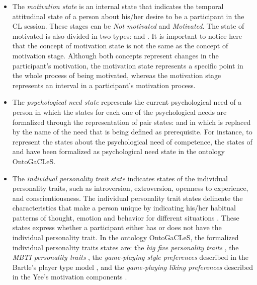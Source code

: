 \begin{itemize}
\item
The \emph{motivation state} is an internal state that indicates the temporal attitudinal state of a person about his/her desire to be a participant in the CL session.
These stages can be \emph{Not motivated} and \emph{Motivated}. The state of motivated is also divided in two types:  and  \cite{DeciRyan2010}.
It is important to notice here that the concept of motivation state is not the same as the concept of motivation stage.
Although both concepts represent changes in the participant’s motivation, the motivation state represents a specific point in the whole process of being motivated, whereas the motivation stage represents an interval in a participant's motivation process.

\item
The \emph{psychological need state} represents the current psychological need of a person in which the states for each one of the psychological needs are formalized through the representation of pair states:
 and  in which  is replaced by the name of the need that is being defined as prerequisite.
For instance, to represent the states about the psychological need of competence, the states of  and  have been formalized as psychological need state in the ontology OntoGaCLeS.

\item
The \emph{individual personality trait state} indicates states of the individual personality traits, such as introversion, extroversion, openness to experience, and conscientiousness.
The individual personality trait states delineate the characteristics that make a person unique by indicating his/her habitual patterns of thought, emotion and behavior for different situations \cite{MatthewsDearyWhiteman2003}.
These states express whether a participant either has or does not have the individual personality trait.
In the ontology OntoGaCLeS, the formalized individual personality traits states are:
the \emph{big five personality traits} \cite{CostaMacCrae1992},
the \emph{MBTI personality traits} \cite{Briggs1976},
the \emph{game-playing style preferences} described in the Bartle's player type model \cite{Bartle2004}, and
the \emph{game-playing liking preferences} described in the Yee's motivation components \cite{Yee2006}.
\end{itemize}

